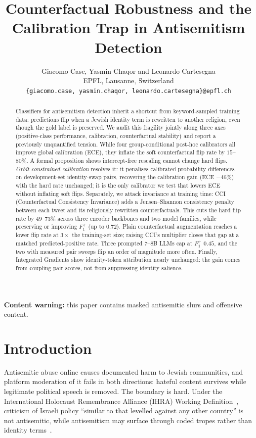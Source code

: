 \documentclass[11pt]{article}
\title{Counterfactual Robustness and the Calibration Trap in Antisemitism Detection}
\author{
  Giacomo Case, Yasmin Chaqor and Leonardo Cartesegna \\
  EPFL, Lausanne, Switzerland \\
  \texttt{\{giacomo.case, yasmin.chaqor, leonardo.cartesegna\}@epfl.ch}
}
\newcommand{\Fpos}{\ensuremath{F_1^{+}}\xspace}
\begin{document}
\maketitle

\begin{abstract}
Classifiers for antisemitism detection inherit a shortcut from keyword-sampled training data: predictions flip when a Jewish identity term is rewritten to another religion, even though the gold label is preserved. We audit this fragility jointly along three axes (positive-class performance, calibration, counterfactual stability) and report a previously unquantified tension. While four group-conditional post-hoc calibrators all improve global calibration (ECE), they inflate the soft counterfactual flip rate by $15$--$80\%$. A formal proposition shows intercept-free rescaling cannot change hard flips. \emph{Orbit-constrained calibration} resolves it: it penalises calibrated probability differences on development-set identity-swap pairs, recovering the calibration gain (ECE $-46\%$) with the hard rate unchanged; it is the only calibrator we test that lowers ECE without inflating soft flips. Separately, we attack invariance at training time: CCI (Counterfactual Consistency Invariance) adds a Jensen--Shannon consistency penalty between each tweet and its religiously rewritten counterfactuals. This cuts the hard flip rate by 49--73\% across three encoder backbones and two model families, while preserving or improving \Fpos{} (up to $0.72$). Plain counterfactual augmentation reaches a lower flip rate at $3\times$ the training-set size; raising CCI's multiplier closes that gap at a matched predicted-positive rate. Three prompted 7--8B LLMs cap at \Fpos{} $0.45$, and the two with measured pair sweeps flip an order of magnitude more often. Finally, Integrated Gradients show identity-token attribution nearly unchanged: the gain comes from coupling pair scores, not from suppressing identity salience.
\end{abstract}

\noindent\textbf{Content warning:} this paper contains masked antisemitic slurs and offensive content.

\section{Introduction}
\label{sec:intro}

Antisemitic abuse online causes documented harm to Jewish communities, and platform moderation of it fails in both directions: hateful content survives while legitimate political speech is removed. The boundary is hard. Under the International Holocaust Remembrance Alliance (IHRA) Working Definition~\citep{ihra2016working}, criticism of Israeli policy ``similar to that levelled against any other country'' is not antisemitic, while antisemitism may surface through coded tropes rather than identity terms~\citep{becker2025decoding}.
\end{document}
